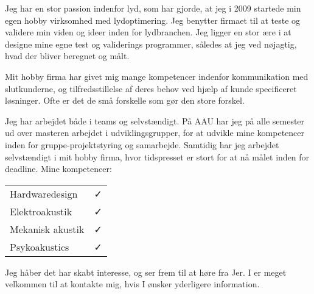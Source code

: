\documentclass{my_application}
\begin{document}
Jeg har en stor passion indenfor lyd, som har gjorde, at jeg i 2009 startede min egen hobby virksomhed med lydoptimering. Jeg benytter firmaet til at teste og validere min viden og ideer inden for lydbranchen. Jeg ligger en stor ære i at designe mine egne test og validerings programmer, således at jeg ved nøjagtig, hvad der bliver beregnet og målt. 

Mit hobby firma har givet mig mange kompetencer indenfor kommunikation med slutkunderne, og tilfredsstillelse af deres behov ved hjælp af kunde specificeret løsninger. Ofte er det de små forskelle som gør den store forskel.

Jeg har arbejdet både i teams og selvstændigt. På AAU har jeg på alle semester ud over masteren arbejdet i udviklingsgrupper, for at udvikle mine kompetencer inden for gruppe-projektstyring og samarbejde. Samtidig har jeg arbejdet selvstændigt i mit hobby firma, hvor tidspresset er stort for at nå målet inden for deadline. 
\skipline
%
Mine kompetencer:
\begin{table}[!ht]
	\begin{tabular}{l c}
		Hardwaredesign & \faCheck \\
		Elektroakustik & \faCheck \\
		Mekanisk akustik & \faCheck\\
		Psykoakustics & \faCheck
	\end{tabular}
\end{table}
%
\skipline
%
Jeg håber det har skabt interesse, og ser frem til at høre fra Jer. 
\newline
\newline
I er meget velkommen til at kontakte mig, hvis I ønsker yderligere information.
\skipline
%	
\end{document}
